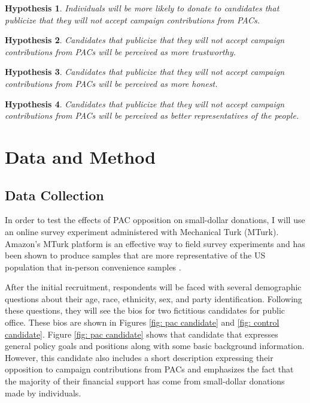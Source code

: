 \documentclass[12pt]{article}
\newtheorem{hyp}{Hypothesis}
\begin{document}
 \begin{hyp}
    Individuals will be more likely to donate to candidates that publicize that they will not accept campaign contributions from PACs.
\end{hyp}

\begin{hyp}
    Candidates that publicize that they will not accept campaign contributions from PACs will be perceived as more trustworthy.
\end{hyp}

\begin{hyp}
    Candidates that publicize that they will not accept campaign contributions from PACs will be perceived as more honest.
\end{hyp}

\begin{hyp}
    Candidates that publicize that they will not accept campaign contributions from PACs will be perceived as better representatives of the people.
\end{hyp}


\section{Data and Method}

\subsection{Data Collection}

In order to test the effects of PAC opposition on small-dollar donations, I will use an online survey experiment administered with Mechanical Turk (MTurk). Amazon's MTurk platform is an effective way to field survey experiments and has been shown to produce samples that are more representative of the US population that in-person convenience samples \citep{berinsky_using_2011}. 

After the initial recruitment, respondents will be faced with several demographic questions about their age, race, ethnicity, sex, and party identification. Following these questions, they will see the bios for two fictitious candidates for public office. These bios are shown in Figures \ref{fig: pac candidate} and \ref{fig: control candidate}. Figure \ref{fig: pac candidate} shows that candidate that expresses general policy goals and positions along with some basic background information. However, this candidate also includes a short description expressing their opposition to campaign contributions from PACs and emphasizes the fact that the majority of their financial support has come from small-dollar donations made by individuals.  
\end{document}
